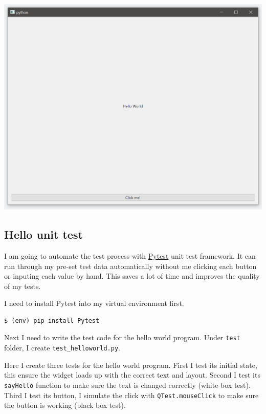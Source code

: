 \documentclass[a4paper]{report}
\begin{document}
\includegraphics[width=\linewidth]{Hello-World.png}

\subsection{Hello unit test}

I am going to automate the test process with \href{https://docs.pytest.org/}{Pytest} unit test framework. It can run through my pre-set test data automatically without me clicking each button or inputing each value by hand. This saves a lot of time and improves the quality of my tests.

I need to install Pytest into my virtual environment first.

\begin{verbatim}
$ (env) pip install Pytest
\end{verbatim}

Next I need to write the test code for the hello world program. Under \texttt{test} folder, I create \texttt{test_helloworld.py}.

Here I create three tests for the hello world program. First I test its initial state, this ensure the widget loads up with the correct text and layout. Second I test its \texttt{sayHello} function to make sure the text is changed correctly (white box test). Third I test its button, I simulate the click with \texttt{QTest.mouseClick} to make sure the button is working (black box test).

\inputminted{python}{../tests/test_helloworld.py}
\end{document}
